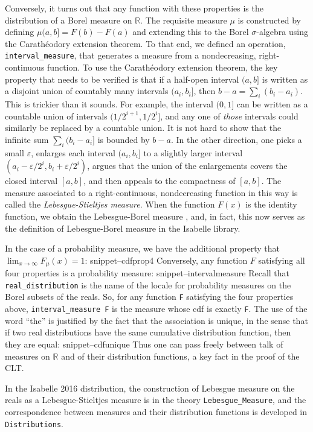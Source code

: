 \documentclass{svjour3}
\newcommand{\RR}{\mathbb{R}}
\newcommand{\Snippet}[1]{\csname snippet--#1\endcsname}
\begin{document}
Conversely, it turns out that any function with these properties is the distribution of a Borel measure on $\RR$. The requisite measure $\mu$ is constructed by defining $\mu (a,b] = F(b) - F(a)$ and extending this to the Borel $\sigma$-algebra using the Carath\'eodory extension theorem. To that end, we defined an operation, \texttt{interval\_measure}, that generates a measure from a nondecreasing, right-continuous function. To use the Carath\'eodory extension theorem, the key property that needs to be verified is that if a half-open interval $(a, b]$ is written as a disjoint union of countably many intervals $(a_i, b_i]$, then $b - a = \sum_i (b_i - a_i)$. This is trickier than it sounds. For example, the interval $(0, 1]$ can be written as a countable union of intervals $(1/2^{i+1}, 1/2^i]$, and any one of \emph{those} intervals could similarly be replaced by a countable union. It is not hard to show that the infinite sum $\sum_i (b_i - a_i]$ is bounded by $b - a$. In the other direction, one picks a small $\varepsilon$, enlarges each interval $(a_i, b_i]$ to a slightly larger interval $(a_i - \varepsilon/2^i, b_i + \varepsilon / 2^i)$, argues that the union of the enlargements covers the closed interval $[a, b]$, and then appeals to the compactness of $[a,b]$. The measure associated to a right-continuous, nondecreasing function in this way is called the \emph{Lebesgue-Stieltjes measure}. When the function $F(x)$ is the identity function, we obtain the Lebesgue-Borel measure , and, in fact, this now serves as the definition of Lebesgue-Borel measure in the Isabelle library.

In the case of a probability measure, we have the additional property that $\lim_{x \rightarrow \infty} F_\mu(x) = 1$:
\Snippet{cdfprop4}
Conversely, any function $F$ satisfying all four properties is a probability measure:
\Snippet{intervalmeasure}
Recall that \texttt{real\_distribution} is the name of the locale for probability measures on the Borel subsets of the reals. So, for any function \texttt{F} satisfying the four properties above, \texttt{interval\_measure F} is the measure whose cdf is exactly \texttt{F}. The use of the word ``the'' is justified by the fact that the association is unique, in the sense that if two real distributions have the same cumulative distribution function, then they are equal:
\Snippet{cdfunique}
Thus one can pass freely between talk of measures on $\RR$ and of their distribution functions, a key fact in the proof of the CLT.

In the Isabelle 2016 distribution, the construction of Lebesgue measure on the reals as a Lebesgue-Stieltjes measure is in the theory \texttt{Lebesgue\_Measure}, and the correspondence between measures and their distribution functions is developed in \texttt{Distributions}.
\end{document}

